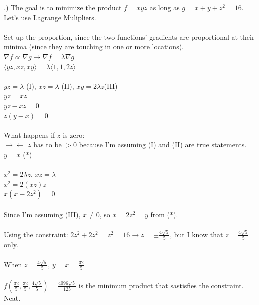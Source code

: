 \documentclass[12pt]{article}
\begin{document}
.) The goal is to minimize the product $f = xyz$ as long as $g = x + y + z^{2} = 16$. Let's use Lagrange Mulipliers.\\\\
\noindent Set up the proportion, since the two functions' gradients are proportional at their minima (since they are touching in one or more locations).
\noindent $\nabla f \propto \nabla g \rightarrow \nabla f = \lambda \nabla g$\\
\noindent $ \langle yz, xz, xy\rangle = \lambda \langle 1, 1, 2z\rangle$\\\\
\noindent $yz = \lambda$ (I), \hspace{10pt} $xz = \lambda$ (II), \hspace{10pt} $xy = 2\lambda z$(III)\\
\noindent $yz = xz$\\
\noindent $yz - xz = 0$\\
\noindent $z(y -x) = 0$\\\\
\noindent What happens if $z$ is zero: \\
\noindent $\rightarrow \leftarrow$ $z$ has to be $> 0$ because I'm assuming (I) and (II) are true statements.\\
\noindent $y = x$ (*)\\\\
\noindent $x^{2} = 2\lambda z$, \hspace{10pt} $xz = \lambda$\\
\noindent $x^{2} = 2(xz)z$\\
\noindent $x(x - 2z^{2}) = 0$\\\\
\noindent Since I'm assuming (III), $x \neq 0$, so $x = 2z^{2} = y$ from (*).\\\\
\noindent Using the constraint: $2z^{2} + 2z^{2} = z^{2} = 16 \rightarrow z = \pm \frac{4\sqrt{5}}{5}$, but I know that $z = \frac{4\sqrt{5}}{5}$ only. \\\\
\noindent When $z = \frac{4\sqrt{5}}{5}$, $y = x = \frac{32}{5}$\\\\
\noindent $f(\frac{32}{5}, \frac{32}{5}, \frac{4\sqrt{5}}{5}) = \frac{4096\sqrt{5}}{125}$ is the minimum product that sastisfies the constraint. Neat. \bcsmbh
\end{document}
